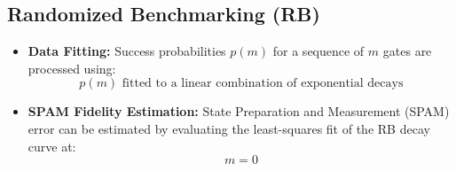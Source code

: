 \documentclass{article}
\begin{document}
\subsection*{Randomized Benchmarking (RB)}
\begin{itemize}
    \item \textbf{Data Fitting:} Success probabilities $p(m)$ for a sequence of $m$ gates are processed using:
    \[
    p(m) \text{ fitted to a linear combination of exponential decays}
    \]
    \item \textbf{SPAM Fidelity Estimation:} State Preparation and Measurement (SPAM) error can be estimated by evaluating the least-squares fit of the RB decay curve at:
    \[
    m = 0
    \]
\end{itemize}
\end{document}
